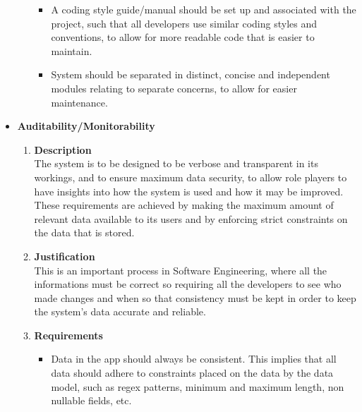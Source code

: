 \documentclass[a4paper,10pt]{article}
\begin{document}
\begin{itemize}
\begin{enumerate}
\begin{itemize}
		\item A coding style guide/manual should be set up and associated with the project, such that all developers use similar coding styles and conventions, to allow for more readable code that is easier to maintain.
		\item System should be separated in distinct, concise and independent modules relating to separate concerns, to allow for easier maintenance.
	\end{itemize}
\end{enumerate}
\item \textbf {Auditability/Monitorability}
\begin{enumerate}
\item \textbf{Description} \\
The system is to be designed to be verbose and transparent in its workings, and to ensure maximum data security, to allow role players to have insights into how the system is used and how it may be improved. These requirements are achieved by making the maximum amount of relevant data available to its users and by enforcing strict constraints on the data that is stored. 
\item \textbf{Justification} \\
This is an important process in Software Engineering, where all the informations must be correct so requiring all the developers to see who made changes and when so that consistency must be kept in order to keep the system's data accurate and reliable.
\item \textbf{Requirements}
	\begin{itemize}
		\item Data in the app should always be consistent. This implies that all data should adhere to constraints placed on the data by the data model, such as regex patterns, minimum and maximum length, non nullable fields, etc.
	\end{itemize}
\end{enumerate}


\end{itemize}
\end{document}
